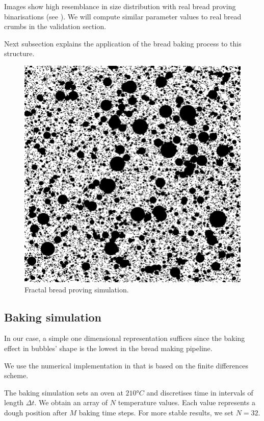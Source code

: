 \documentclass[final,5p,times]{elsarticle}
\begin{document}
Images show high resemblance in size distribution with real bread proving binarisations (see \cite{Babin2006}). We will compute similar parameter values to real bread crumbs in the validation section.


Next subsection explains the application of the bread baking process to this structure.


\begin{figure}
\includegraphics[scale=0.28]{bubbles.png}
\caption{Fractal bread proving simulation.}
\label{FigProving}
\end{figure}


\subsection{Baking simulation}
In our case, a simple one dimensional representation suffices \cite{Powathil2004,Purlis2010}  since the baking effect in bubbles' shape is the lowest in the bread making pipeline. 

We use the numerical implementation in \cite{Powathil2004} that is based on the finite differences scheme. 

The baking simulation sets an oven at $210°C$ and discretises time in intervals of length $\Delta t$.  We obtain an array of $N$ temperature values. Each value represents a dough position after $M$ baking time steps. For more stable results, we set $N=32$.
\end{document}
